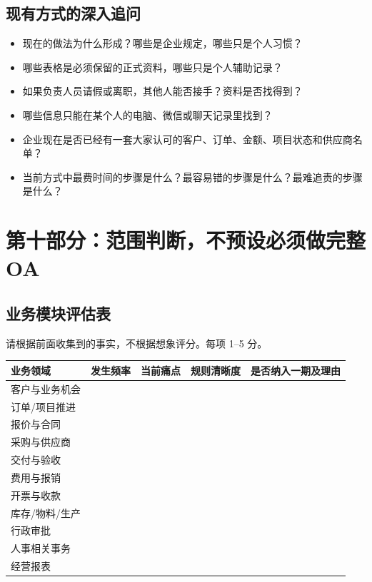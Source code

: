 \documentclass[UTF8,a4paper,11pt]{ctexart}
\begin{document}
\subsection{现有方式的深入追问}
\begin{itemize}
  \item 现在的做法为什么形成？哪些是企业规定，哪些只是个人习惯？
  \item 哪些表格是必须保留的正式资料，哪些只是个人辅助记录？
  \item 如果负责人员请假或离职，其他人能否接手？资料是否找得到？
  \item 哪些信息只能在某个人的电脑、微信或聊天记录里找到？
  \item 企业现在是否已经有一套大家认可的客户、订单、金额、项目状态和供应商名单？
  \item 当前方式中最费时间的步骤是什么？最容易错的步骤是什么？最难追责的步骤是什么？
\end{itemize}

\section{第十部分：范围判断，不预设必须做完整 OA}
\subsection{业务模块评估表}
请根据前面收集到的事实，不根据想象评分。每项 1--5 分。
\begin{longtable}{p{}p{}p{}p{}p{}}
\toprule
业务领域 & 发生频率 & 当前痛点 & 规则清晰度 & 是否纳入一期及理由 \\
\midrule
客户与业务机会 & & & & \\
订单/项目推进 & & & & \\
报价与合同 & & & & \\
采购与供应商 & & & & \\
交付与验收 & & & & \\
费用与报销 & & & & \\
开票与收款 & & & & \\
库存/物料/生产 & & & & \\
行政审批 & & & & \\
人事相关事务 & & & & \\
经营报表 & & & & \\
\bottomrule
\end{longtable}
\end{document}
